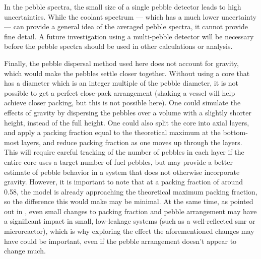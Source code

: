 In the pebble spectra, the small size of a single pebble detector leads to high uncertainties.  While the coolant spectrum --- which has a much lower uncertainty --- can provide a general idea of the averaged pebble spectra, it cannot provide fine detail.  A future investigation using a multi-pebble detector will be necessary before the pebble spectra should be used in other calculations or analysis.

Finally, the pebble dispersal method used here does not account for gravity, which would make the pebbles settle closer together.  Without using a core that has a diameter which is an integer multiple of the pebble diameter, it is not possible to get a perfect close-pack arrangement (shaking a vessel will help achieve closer packing, but this is not possible here).  One could simulate the effects of gravity by dispersing the pebbles over a volume with a slightly shorter height, instead of the full height.  One could also split the core into axial layers, and apply a packing fraction equal to the theoretical maximum at the bottom-most layers, and reduce packing fraction as one moves up through the layers.  This will require careful tracking of the number of pebbles in each layer if the entire core uses a target number of fuel pebbles, but may provide a better estimate of pebble behavior in a system that does not otherwise incorporate gravity.  However, it is important to note that at a packing fraction of around 0.58, the model is already approaching the theoretical maximum packing fraction, so the difference this would make may be minimal.  At the same time, as pointed out in \cite{karriem_mcnp_2001}, even small changes to packing fraction and pebble arrangement may have a significant impact in small, low-leakage systems (such as a well-reflected \acrshort{smr} or microreactor), which is why exploring the effect the aforementioned changes may have could be important, even if the pebble arrangement doesn't appear to change much.